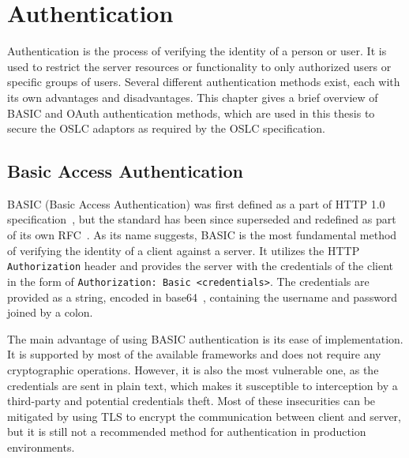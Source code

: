 
\chapter{Authentication}
\label{chapter:authentication}
Authentication is the process of verifying the identity of a person or user. It is used to restrict the server resources or functionality to only authorized users or specific groups of users. Several different authentication methods exist, each with its own advantages and disadvantages. This chapter gives a brief overview of BASIC and OAuth authentication methods, which are used in this thesis to secure the OSLC adaptors as required by the OSLC specification.

\section{Basic Access Authentication}
BASIC (Basic Access Authentication) was first defined as a part of HTTP 1.0 specification \cite{http1.0_w3}, but the standard has been since superseded and redefined as part of its own RFC \cite{basic_auth_rfc}. As its name suggests, BASIC is the most fundamental method of verifying the identity of a client against a server. It utilizes the HTTP \texttt{Authorization} header and provides the server with the credentials of the client in the form of \texttt{Authorization: Basic <credentials>}. The credentials are provided as a string, encoded in base64 \cite{base64_rfc}, containing the username and password joined by a colon.

The main advantage of using BASIC authentication is its ease of implementation. It is supported by most of the available frameworks and does not require any cryptographic operations. However, it is also the most vulnerable one, as the credentials are sent in plain text, which makes it susceptible to interception by a third-party and potential credentials theft. Most of these insecurities can be mitigated by using TLS to encrypt the communication between client and server, but it is still not a recommended method for authentication in production environments.

